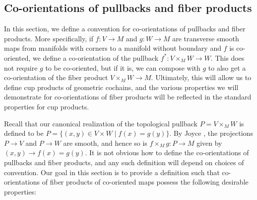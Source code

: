 \begin{comment}
		On the other hand, consider $(\bd W) \times I$ as part of the boundary of $W \times I$.
		The standard boundary co-orientation for $(\bd W) \times I$ in $W \times I$ is $(\beta_{(\bd W) \times I},\beta_{(\bd W) \times I}\wedge\beta_{\nu_\bd})$.
		This is independent of the choice of $\beta_{(\bd W) \times I}$, so we may take $\beta_{(\bd W) \times I} = \beta_W \wedge \beta_{e_1}$, where $\beta_{e_1}$ is positively-directed in $I$.
		Then
		$$(\beta_{(\bd W) \times I},\beta_{(\bd W) \times I}\wedge\beta_{\nu_\bd}) = (\beta_{\bd W} \wedge \beta_{e_1},\beta_{\bd W} \wedge \beta_{e_1}\wedge\beta_{\nu_\bd}) = -(\beta_{\bd W} \wedge \beta_{e_1},\beta_{\bd W} \wedge \beta_{\nu_\bd}\wedge\beta_{\nu_I}).$$
		Composing with the induced co-orientation $(\beta_W \wedge \beta_{e_1},\beta_M)$ of $G$ gives the composite $(\bd W) \times I \xr{i_{(\bd W) \times I}}W \times I \xr{G} M$ the co-orientation $-(\beta_{\bd W} \wedge \beta_{e_1},\beta_M)$ if $\beta_W = \beta_{\bd W} \wedge \beta_{\nu_\bd}$ and $(\beta_{\bd W} \wedge \beta_{e_1},\beta_M)$ otherwise.
		Thus, altogether, the $(\bd W) \times I$ boundary component of $W \times I$ with its boundary co-orientation is $-G_\bd$.
	\end{proof}
\end{comment}

\subsection{Co-orientations of pullbacks and fiber products}\label{S: co-orient pullbacks}

In this section, we define a convention for co-orientations of pullbacks and fiber products.
More specifically, if $f \colon V \to M$ and $g \colon W \to M$ are transverse smooth maps from manifolds with corners to a manifold without boundary and $f$ is co-oriented, we define a co-orientation of the pullback $f^* \colon V \times_M W \to W$.
This does not require $g$ to be co-oriented, but if it is, we can compose with $g$ to also get a co-orientation of the fiber product $V \times_M W \to M$.
Ultimately, this will allow us to define cup products of geometric cochains, and the various properties we will demonstrate for co-orientations of fiber products will be reflected in the standard properties for cup products.

Recall that our canonical realization of the topological pullback $P = V \times_M W$ is defined to be $P = \{(x,y) \in V \times W \mid f(x) = g(y)\}$.
By Joyce \cite[Section 6]{Joy12}, the projections $P \to V$ and $P \to W$ are smooth, and hence so is $f \times_M g \colon P \to M$ given by $(x,y) \to f(x) = g(y)$.
It is not obvious how to define the co-orientations of pullbacks and fiber products, and any such definition will depend on choices of convention.
Our goal in this section is to provide a definition such that co-orientations of fiber products of co-oriented maps possess the following desirable properties:

